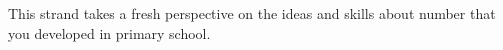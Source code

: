 




\graphicspath{{NUM/Introduction/}}





\label{chap:NUMintro}







This strand takes a fresh perspective  on the ideas and skills about number that
you developed in primary school.   
